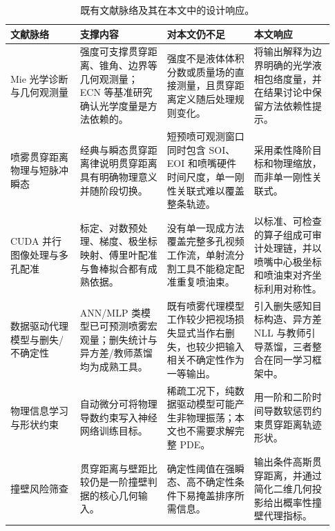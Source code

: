 \begin{table}[t]
\centering
\footnotesize
\setlength{\tabcolsep}{2pt}
\renewcommand{\arraystretch}{1.12}
\begin{tabular}{@{}L{0.20\linewidth}L{0.25\linewidth}L{0.25\linewidth}L{0.23\linewidth}@{}}
\toprule
文献脉络 & 支撑内容 & 对本文仍不足 & 本文响应 \\
\midrule
Mie 光学诊断与几何观测量 & 强度可支撑贯穿距离、锥角、边界等几何观测量；ECN 等基准研究确认光学度量是方法依赖的。 & 强度不是液体体积分数或质量场的直接测量，且贯穿距离定义随后处理规则变化。 & 将输出解释为边界明确的光学液相包络度量，并在结果讨论中保留方法依赖性提示。 \\
喷雾贯穿距离物理与短脉冲瞬态 & 经典与瞬态贯穿距离律说明贯穿距离具有明确物理意义并随阶段切换。 & 短预喷可观测窗口同时包含 SOI、EOI 和喷嘴硬件时间尺度，单一刚性关联式难以覆盖整条轨迹。 & 采用柔性降阶目标和物理缩放，而非单一刚性关联式。 \\
CUDA 并行图像处理与多孔配准 & 标定、对数预处理、梯度、极坐标映射、傅里叶配准与鲁棒拟合都有成熟依据。 & 没有单一现成方法覆盖完整多孔视频工作流，单射流分割工具不能稳定配准重复喷油束。 & 以标准、可检查的算子组成可审计处理链，并以喷嘴中心极坐标和喷油束对齐坐标利用对称性。 \\
数据驱动代理模型与删失/不确定性 & ANN/MLP 类模型已可预测喷雾宏观量；删失统计与异方差/教师蒸馏均为成熟工具。 & 既有喷雾代理模型工作较少把视场损失显式当作右删失，也较少把输入相关不确定性作为一等输出。 & 引入删失感知目标构造、异方差 NLL 与教师引导蒸馏，三者整合在同一学习框架中。 \\
物理信息学习与形状约束 & 自动微分可将物理导数约束写入神经网络训练目标。 & 稀疏工况下，纯数据驱动模型可能产生非物理振荡；本文也不需要求解完整 PDE。 & 用一阶和二阶时间导数软惩罚约束贯穿距离轨迹形状。 \\
撞壁风险筛查 & 贯穿距离与壁距比较仍是一阶撞壁判据的核心几何输入。 & 确定性阈值在强瞬态、高不确定性条件下易掩盖排序所需信息。 & 输出条件高斯贯穿距离，并通过简化二维几何投影给出概率性撞壁代理指标。 \\
\bottomrule
\end{tabular}
\caption{既有文献脉络及其在本文中的设计响应。}
\label{tab:literature-synthesis-zh}
\end{table}

